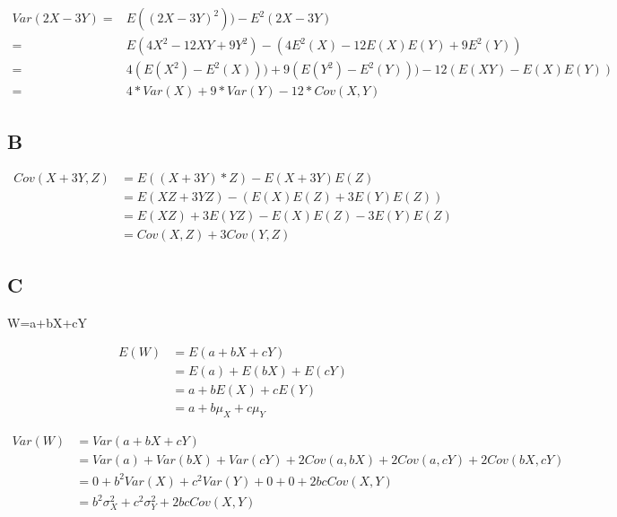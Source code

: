 \documentclass{article}
\begin{document}
	\begin{equation*}
		\begin{split}
			Var(2X-3Y)=&E((2X-3Y)^2))-E^2(2X-3Y)\\
			 =&E(4X^2-12XY+9Y^2)-(4E^2(X)-12E(X)E(Y)+9E^2(Y))\\
			 =&4(E(X^2)-E^2(X)))+9(E(Y^2)-E^2(Y)))-12(E(XY)-E(X)E(Y))\\
			 =&4*Var(X)+9*Var(Y)-12*Cov(X,Y)
		\end{split}
	\end{equation*}
	
	\subsection*{B}
	
	\begin{equation*}
		\begin{split}
			Cov(X+3Y,Z)&=E((X+3Y)*Z)-E(X+3Y)E(Z)\\
						&=E(XZ+3YZ)-(E(X)E(Z)+3E(Y)E(Z))\\
						&=E(XZ)+3E(YZ)-E(X)E(Z)-3E(Y)E(Z)\\
						&=Cov(X,Z)+3Cov(Y,Z)
		\end{split}
	\end{equation*}
	
	\subsection*{C}
	
	W=a+bX+cY
	
	\begin{equation*}
		\begin{split}
			E(W)&=E(a+bX+cY)\\
			&=E(a)+E(bX)+E(cY)\\
			&=a+bE(X)+cE(Y)\\
			&=a+b\mu_X+c\mu_Y
		\end{split}
	\end{equation*}
	
	\begin{equation*}
		\begin{split}
			Var(W)&=Var(a+bX+cY)\\
					&=Var(a)+Var(bX)+Var(cY)+2Cov(a,bX)+2Cov(a,cY)+2Cov(bX,cY)\\
					&=0+b^2Var(X)+c^2Var(Y)+0+0+2bcCov(X,Y)\\
					&=b^2\sigma^2_X+c^2\sigma^2_Y+2bcCov(X,Y)
		\end{split}
	\end{equation*}
\end{document}
